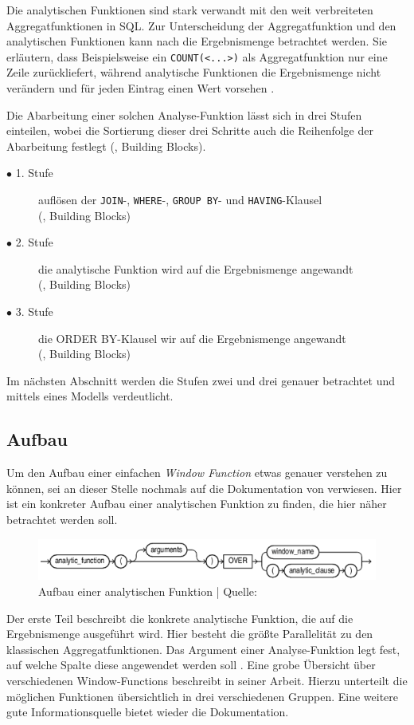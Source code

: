 Die analytischen Funktionen sind stark verwandt mit den weit verbreiteten Aggregatfunktionen
in SQL. Zur Unterscheidung der Aggregatfunktion und den analytischen Funktionen
kann nach \citet{Nuijten2023} die Ergebnismenge betrachtet werden. Sie erläutern,
dass Beispielsweise ein \texttt{COUNT(<...>)} als Aggregatfunktion nur eine
Zeile zurückliefert, während analytische Funktionen die Ergebnismenge nicht verändern
und für jeden Eintrag einen Wert vorsehen \citep{Nuijten2023}.

Die Abarbeitung einer solchen Analyse-Funktion lässt sich in drei Stufen
einteilen, wobei die Sortierung dieser drei Schritte auch die Reihenfolge der Abarbeitung
festlegt (\cite{Nuijten2023}, Building Blocks).
\begin{description}
	\item[$\bullet$ 1. Stufe] auflösen der \texttt{JOIN}-, \texttt{WHERE}-, \texttt{GROUP
		BY}- und \texttt{HAVING}-Klausel \\ (\cite{Nuijten2023}, Building Blocks)

	\item[$\bullet$ 2. Stufe] die analytische Funktion wird auf die Ergebnismenge angewandt
		\\ (\cite{Nuijten2023}, Building Blocks)

	\item[$\bullet$ 3. Stufe] die ORDER BY-Klausel wir auf die Ergebnismenge angewandt
		\\ (\cite{Nuijten2023}, Building Blocks)
\end{description}
Im nächsten Abschnitt werden die Stufen zwei und drei genauer betrachtet und mittels
eines Modells verdeutlicht.

\subsection{Aufbau}
\label{sec:aufbau} Um den Aufbau einer einfachen \textit{Window Function} etwas
genauer verstehen zu können, sei an dieser Stelle nochmals auf die Dokumentation
von \citet{oracle} verwiesen. Hier ist ein konkreter Aufbau einer analytischen Funktion
zu finden, die hier näher betrachtet werden soll.
\begin{figure}[h]
	\centering
	\includegraphics[scale=0.5]{img/aufbauAnalyticFunction.jpg}
	\caption{ Aufbau einer analytischen Funktion | Quelle: \citep{oracle}}
	\label{fig:aufbauAnalyticFunction}
\end{figure}
Der erste Teil beschreibt die konkrete analytische Funktion, die auf die
Ergebnismenge ausgeführt wird. Hier besteht die größte Parallelität zu den klassischen
Aggregatfunktionen. Das Argument einer Analyse-Funktion legt fest, auf welche Spalte
diese angewendet werden soll \citep[S.~110]{schicker2017datenbanken}. Eine grobe
Übersicht über verschiedenen Window-Functions beschreibt \citet[]{ibrahaim23} in
seiner Arbeit. Hierzu unterteilt die möglichen Funktionen übersichtlich in drei verschiedenen
Gruppen. Eine weitere gute Informationsquelle bietet wieder die \citet{oracle} Dokumentation.

